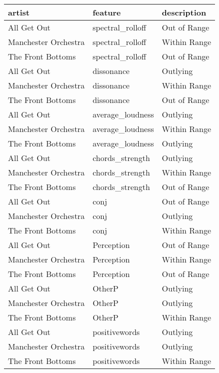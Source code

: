 \documentclass{article}\usepackage[]{graphicx}\usepackage[]{xcolor}
\begin{document}
\begin{table}[ht]

\begin{tabular}{lll}
  \hline
artist & feature & description \\ 
  \hline
All Get Out & spectral\_rolloff & Out of Range \\ 
  Manchester Orchestra & spectral\_rolloff & Within Range \\ 
  The Front Bottoms & spectral\_rolloff & Out of Range \\ 
  All Get Out & dissonance & Outlying \\ 
  Manchester Orchestra & dissonance & Within Range \\ 
  The Front Bottoms & dissonance & Out of Range \\ 
  All Get Out & average\_loudness & Outlying \\ 
  Manchester Orchestra & average\_loudness & Within Range \\ 
  The Front Bottoms & average\_loudness & Outlying \\ 
  All Get Out & chords\_strength & Outlying \\ 
  Manchester Orchestra & chords\_strength & Within Range \\ 
  The Front Bottoms & chords\_strength & Out of Range \\ 
  All Get Out & conj & Out of Range \\ 
  Manchester Orchestra & conj & Outlying \\ 
  The Front Bottoms & conj & Within Range \\ 
  All Get Out & Perception & Out of Range \\ 
  Manchester Orchestra & Perception & Within Range \\ 
  The Front Bottoms & Perception & Out of Range \\ 
  All Get Out & OtherP & Outlying \\ 
  Manchester Orchestra & OtherP & Outlying \\ 
  The Front Bottoms & OtherP & Within Range \\ 
  All Get Out & positivewords & Outlying \\ 
  Manchester Orchestra & positivewords & Outlying \\ 
  The Front Bottoms & positivewords & Within Range \\ 
   \hline
\end{tabular}
\end{table}

 
\end{document}
